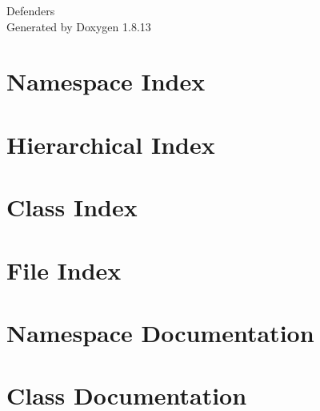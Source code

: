 \documentclass[twoside]{book}
\newcommand{\+}{\discretionary{\mbox{\scriptsize$\hookleftarrow$}}{}{}}
\newcommand{\clearemptydoublepage}{%
  \newpage{\pagestyle{empty}\cleardoublepage}%
}
\begin{document}
\hypersetup{pageanchor=false,
             bookmarksnumbered=true,
             pdfencoding=unicode
            }
\begin{titlepage}
\vspace*{7cm}
\begin{center}%
{\Large Defenders }\\
\vspace*{1cm}
{\large Generated by Doxygen 1.8.13}\\
\end{center}
\end{titlepage}
\clearemptydoublepage
{}
\tableofcontents
\clearemptydoublepage
{}
\hypersetup{pageanchor=true}

\chapter{Namespace Index}

\chapter{Hierarchical Index}

\chapter{Class Index}

\chapter{File Index}

\chapter{Namespace Documentation}


\chapter{Class Documentation}
































\end{document}
